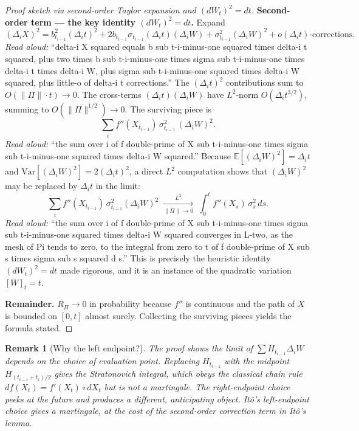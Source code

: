 \documentclass[11pt]{article}
\newtheorem{remark}[theorem]{Remark}
\begin{document}
\begin{proof}[Proof sketch via second-order Taylor expansion and $(dW_t)^2 = dt$]
\smallskip\noindent\textbf{Second-order term --- the key identity $(dW_t)^2 = dt$.}
Expand
\[
(\Delta_i X)^2 = b_{t_{i-1}}^2 (\Delta_i t)^2 + 2 b_{t_{i-1}}\sigma_{t_{i-1}}(\Delta_i t)(\Delta_i W)
  + \sigma_{t_{i-1}}^2 (\Delta_i W)^2 + o(\Delta_i t)\text{-corrections}.
\]
\emph{Read aloud:} ``delta-i X squared equals b sub t-i-minus-one squared times delta-i t squared, plus two times b sub t-i-minus-one times sigma sub t-i-minus-one times delta-i t times delta-i W, plus sigma sub t-i-minus-one squared times delta-i W squared, plus little-o of delta-i t corrections.''
The $(\Delta_i t)^2$ contributions sum to $O(\|\Pi\| \cdot t) \to 0$. The cross-terms
$(\Delta_i t)(\Delta_i W)$ have $L^2$-norm $O(\Delta_i t^{3/2})$, summing to $O(\|\Pi\|^{1/2}) \to 0$.
The surviving piece is
\[
  \sum_i f''(X_{t_{i-1}})\,\sigma_{t_{i-1}}^2\,(\Delta_i W)^2.
\]
\emph{Read aloud:} ``the sum over i of f double-prime of X sub t-i-minus-one times sigma sub t-i-minus-one squared times delta-i W squared.''
Because $\mathbb{E}[(\Delta_i W)^2] = \Delta_i t$ and $\mathrm{Var}[(\Delta_i W)^2] = 2(\Delta_i t)^2$,
a direct $L^2$ computation shows that $(\Delta_i W)^2$ may be replaced by $\Delta_i t$ in the limit:
\[
  \sum_i f''(X_{t_{i-1}})\,\sigma_{t_{i-1}}^2 (\Delta_i W)^2
  \;\xrightarrow[\|\Pi\|\to 0]{L^2}\;
  \int_0^t f''(X_s)\,\sigma_s^2\,ds.
\]
\emph{Read aloud:} ``the sum over i of f double-prime of X sub t-i-minus-one times sigma sub t-i-minus-one squared times delta-i W squared converges in L-two, as the mesh of Pi tends to zero, to the integral from zero to t of f double-prime of X sub s times sigma sub s squared d s.''
This is precisely the heuristic identity $(dW_t)^2 = dt$ made rigorous, and it is an instance of
the quadratic variation $[W]_t = t$.

\smallskip\noindent\textbf{Remainder.}
$R_\Pi \to 0$ in probability because $f''$ is continuous and the path of $X$ is bounded on $[0,t]$
almost surely. Collecting the surviving pieces yields the formula stated.
\end{proof}

\begin{remark}[Why the left endpoint?]
The proof shows the limit of $\sum H_{t_{i-1}}\Delta_i W$ depends on the choice of evaluation
point. Replacing $H_{t_{i-1}}$ with the midpoint $H_{(t_{i-1}+t_i)/2}$ gives the
\emph{Stratonovich} integral, which obeys the classical chain rule
$df(X_t) = f'(X_t) \circ dX_t$ but is not a martingale. The right-endpoint choice peeks at the
future and produces a different, anticipating object. It\^o's left-endpoint choice gives a
martingale, at the cost of the second-order correction term in It\^o's lemma.
\end{remark}
\end{document}
